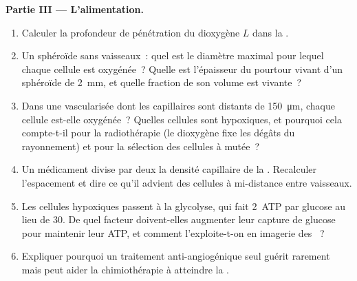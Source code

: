\begin{problem}
\medskip
\noindent\textbf{Partie III --- L'alimentation.}
\begin{enumerate}[resume]
  \item Calculer la profondeur de pénétration du dioxygène $L$ dans la
        .
  \item Un sphéroïde sans vaisseaux~: quel est le diamètre maximal pour
        lequel chaque cellule est oxygénée~? Quelle est l'épaisseur du
        pourtour vivant d'un sphéroïde de \qty{2}{mm}, et quelle
        fraction de son volume est vivante~?
  \item Dans une  vascularisée dont les capillaires sont distants
        de \qty{150}{\micro m}, chaque cellule est-elle oxygénée~?
        Quelles cellules sont hypoxiques, et pourquoi cela compte-t-il
        pour la radiothérapie (le dioxygène fixe les dégâts du
        rayonnement) et pour la sélection des cellules à  mutée~?
  \item Un médicament divise par deux la densité capillaire de la
        . Recalculer l'espacement et dire ce qu'il advient des
        cellules à mi-distance entre vaisseaux.
  \item Les cellules hypoxiques passent à la glycolyse, qui fait
        \qty{2}{ATP} par glucose au lieu de $30$. De quel facteur
        doivent-elles augmenter leur capture de glucose pour maintenir
        leur ATP, et comment l'exploite-t-on en imagerie des ~?
  \item Expliquer pourquoi un traitement anti-angiogénique seul guérit
        rarement mais peut aider la chimiothérapie à atteindre la
        .
\end{enumerate}


\end{problem}
